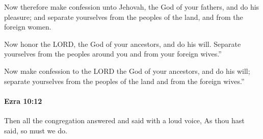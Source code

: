 			\begin{versebox}
					\item[BHS] 
					\item[LXX] 
					\item[ASV] Now therefore make confession unto Jehovah, the God of your fathers, and do his pleasure; and separate yourselves from the peoples of the land, and from the foreign women.
					\item[NIV] Now honor the LORD, the God of your ancestors, and do his will. Separate yourselves from the peoples around you and from your foreign wives.”
					\item[NRSV] Now make confession to the LORD the God of your ancestors, and do his will; separate yourselves from the peoples of the land and from the foreign wives.”
			\end{versebox}

		\paragraph{Ezra 10:12} %
			\label{EZRA-10-12}

			Then all the congregation answered and said with a loud voice, As thou hast said, so must we do.

